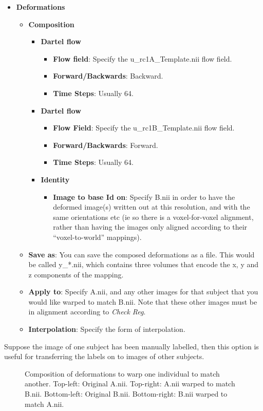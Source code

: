 \begin{itemize}
\item{{\bf Deformations}
  \begin{itemize}
  \item{{\bf Composition}
    \begin{itemize}
    \item{{\bf Dartel flow}
      \begin{itemize}
      \item{{\bf Flow field}: Specify the u\_rc1A\_Template.nii flow field.}
      \item{{\bf Forward/Backwards}: Backward.}
      \item{{\bf Time Steps}: Usually 64.}
      \end{itemize}
    }
    \item{{\bf Dartel flow}
      \begin{itemize}
      \item{{\bf Flow Field}: Specify the u\_rc1B\_Template.nii flow field.}
      \item{{\bf Forward/Backwards}: Forward.}
      \item{{\bf Time Steps}: Usually 64.}
      \end{itemize}
    }
    \item{{\bf Identity}
      \begin{itemize}
      \item{{\bf Image to base Id on}: Specify B.nii in order to have the deformed image(s) written out at this resolution, and with the same orientations etc (ie so there is a voxel-for-voxel alignment, rather than having the images only aligned according to their ``voxel-to-world'' mappings).}
      \end{itemize}
    }
    \end{itemize}
  }
  \item{{\bf Save as}: You can save the composed deformations as a file. This would be called y\_*.nii, which contains three volumes that encode the x, y and z components of the mapping.}
  \item{{\bf Apply to}: Specify A.nii, and any other images for that subject that you would like warped to match B.nii. Note that these other images must be in alignment according to \emph{Check Reg}.}
  \item{{\bf Interpolation}: Specify the form of interpolation.}
  \end{itemize}
}
\end{itemize}

Suppose the image of one subject has been manually labelled, then this option is useful for transferring the labels on to images of other subjects.

\begin{figure}
\begin{center}
\end{center}
\caption{
Composition of deformations to warp one individual to match another.
Top-left: Original A.nii.
Top-right: A.nii warped to match B.nii.
Bottom-left: Original B.nii.
Bottom-right: B.nii warped to match A.nii.
\label{Fig:AtoB}}
\end{figure}


